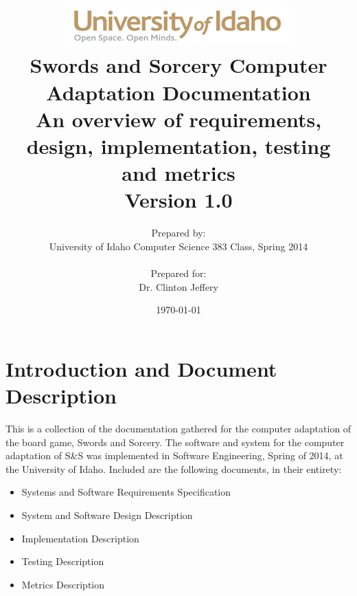 \documentclass[twoside,letterpaper,pdftex]{article}
\title{ 
\center\includegraphics[width=\linewidth]{UIGraphic}\\
		\center\textbf{\Large{Swords and Sorcery Computer Adaptation Documentation}\\
		An overview of requirements, design, implementation, testing and metrics} \\
		Version 1.0}
\author{Prepared by:\\University of Idaho Computer Science 383 Class, Spring 2014\\
\bigskip\\
Prepared for:\\
Dr. Clinton Jeffery\\}
\date{\today}
\begin{document}
\maketitle
\pagebreak

\section*{Introduction and Document Description}
This is a collection of the documentation gathered for the computer adaptation of the board game, Swords and Sorcery. The software and system for the computer adaptation of S\&S was implemented in Software Engineering, Spring of 2014, at the University of Idaho. Included are the following documents, in their entirety:
\begin{itemize}
\item Systems and Software Requirements Specification
\item System and Software Design Description
\item Implementation Description
\item Testing Description
\item Metrics Description
\end{itemize}






\end{document}
